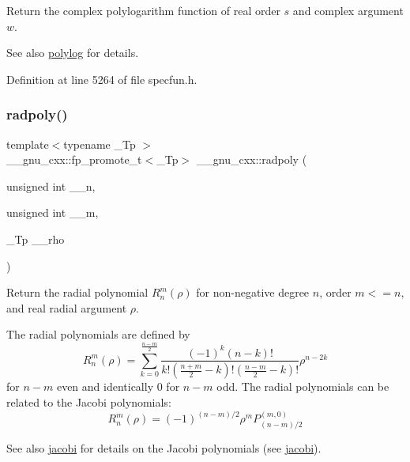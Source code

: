 Return the complex polylogarithm function of real order $ s $ and complex argument $ w $.

\begin{DoxySeeAlso}{See also}
\hyperlink{group__gnu__math__spec__func_gabcc5480ad739561c2debd6a8a352084f}{polylog} for details. 
\end{DoxySeeAlso}


Definition at line 5264 of file specfun.\+h.

\mbox{\label{group__gnu__math__spec__func_ga195db2592888b7a8df870d9eaeff8d05}} 
\subsubsection{\texorpdfstring{radpoly()}{radpoly()}}
{\footnotesize\ttfamily template$<$typename \+\_\+\+Tp $>$ \\
\+\_\+\+\_\+gnu\+\_\+cxx\+::fp\+\_\+promote\+\_\+t$<$\+\_\+\+Tp$>$ \+\_\+\+\_\+gnu\+\_\+cxx\+::radpoly (\begin{DoxyParamCaption}\item[{unsigned int}]{\+\_\+\+\_\+n,  }\item[{unsigned int}]{\+\_\+\+\_\+m,  }\item[{\+\_\+\+Tp}]{\+\_\+\+\_\+rho }\end{DoxyParamCaption})\hspace{0.3cm}{\ttfamily [inline]}}

Return the radial polynomial $ R_n^m(\rho) $ for non-\/negative degree $ n $, order $ m <= n $, and real radial argument $ \rho $.

The radial polynomials are defined by \[ R_n^m(\rho) = \sum_{k=0}^{\frac{n-m}{2}} \frac{(-1)^k(n-k)!}{k!(\frac{n+m}{2}-k)!(\frac{n-m}{2}-k)!} \rho^{n-2k} \] for $ n - m $ even and identically 0 for $ n - m $ odd. The radial polynomials can be related to the Jacobi polynomials\+: \[ R_n^m(\rho) = (-1)^{(n-m)/2} \rho^m P_{(n-m)/2}^{(m,0)} \] \begin{DoxySeeAlso}{See also}
\hyperlink{group__gnu__math__spec__func_gad54f6601748324d268532138eb38ca33}{jacobi} for details on the Jacobi polynomials (see \hyperlink{group__gnu__math__spec__func_gad54f6601748324d268532138eb38ca33}{jacobi}).
\end{DoxySeeAlso}

